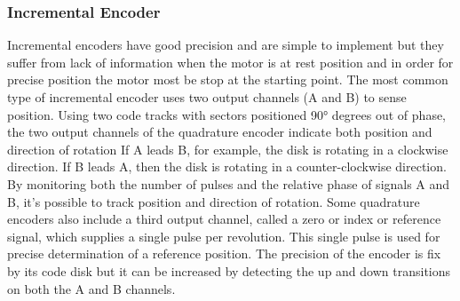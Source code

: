 \documentclass[12pt]{article}
\begin{document}
\subsubsection*{Incremental Encoder}
Incremental encoders have good precision and are simple to implement but they 
suffer from lack of information when the motor is at rest position and in order for precise 
position the motor most be stop at the starting point.  
The most common type of incremental encoder uses two output channels (A and B) to 
sense position. Using two code tracks with sectors positioned 90° degrees out of phase, the 
two output channels of the quadrature encoder indicate both position and direction of rotation 
If A leads B, for example, the disk is rotating in a clockwise direction. 
If B leads A, then the disk is rotating in a counter-clockwise direction. By monitoring both 
the number of pulses and the relative phase of signals A and B, it's possible to track position 
and direction of rotation. Some quadrature encoders also include a third output channel, 
called a zero or index or reference signal, which supplies a single pulse per revolution. This 
single pulse is used for precise determination of a reference position. The precision of the 
encoder is fix by its code disk but it can be increased by detecting the up and down 
transitions on both the A and B channels. 
\end{document}
